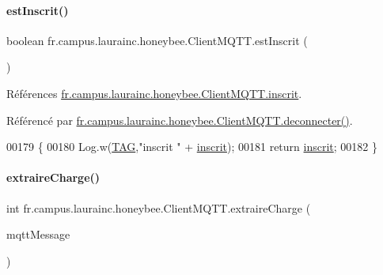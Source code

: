 \paragraph{\texorpdfstring{est\+Inscrit()}{estInscrit()}}
{\footnotesize\ttfamily boolean fr.\+campus.\+laurainc.\+honeybee.\+Client\+M\+Q\+T\+T.\+est\+Inscrit (\begin{DoxyParamCaption}{ }\end{DoxyParamCaption})}



Références \hyperlink{classfr_1_1campus_1_1laurainc_1_1honeybee_1_1_client_m_q_t_t_a774f2fd702c2a3581bf8dbfa341274fc}{fr.\+campus.\+laurainc.\+honeybee.\+Client\+M\+Q\+T\+T.\+inscrit}.



Référencé par \hyperlink{classfr_1_1campus_1_1laurainc_1_1honeybee_1_1_client_m_q_t_t_af067ec55e00ec18a14e248279872242f}{fr.\+campus.\+laurainc.\+honeybee.\+Client\+M\+Q\+T\+T.\+deconnecter()}.


\begin{DoxyCode}
00179                                 \{
00180         Log.w(\hyperlink{classfr_1_1campus_1_1laurainc_1_1honeybee_1_1_client_m_q_t_t_a378324f705f8d7870c5f7be0cea02890}{TAG},\textcolor{stringliteral}{"inscrit "} + \hyperlink{classfr_1_1campus_1_1laurainc_1_1honeybee_1_1_client_m_q_t_t_a774f2fd702c2a3581bf8dbfa341274fc}{inscrit});
00181         \textcolor{keywordflow}{return} \hyperlink{classfr_1_1campus_1_1laurainc_1_1honeybee_1_1_client_m_q_t_t_a774f2fd702c2a3581bf8dbfa341274fc}{inscrit};
00182     \}
\end{DoxyCode}
\mbox{\label{classfr_1_1campus_1_1laurainc_1_1honeybee_1_1_client_m_q_t_t_a93572795db92f79f417982f4785b71e0}} 
\paragraph{\texorpdfstring{extraire\+Charge()}{extraireCharge()}}
{\footnotesize\ttfamily int fr.\+campus.\+laurainc.\+honeybee.\+Client\+M\+Q\+T\+T.\+extraire\+Charge (\begin{DoxyParamCaption}\item[{Mqtt\+Message}]{mqtt\+Message }\end{DoxyParamCaption})}



